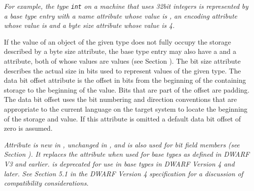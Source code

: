 \textit{For example, the 
 type \texttt{int} on a machine that uses 32\dash bit
integers is represented by a base type entry with a name
attribute whose value is , an encoding attribute
whose value is \DWATEsigned{}
and a byte size attribute whose value is 4.}

If the value of an object of the given type does not fully
occupy the storage described by a byte size attribute,
\hypertarget{chap:DWATdatabitoffsetbasetypebitlocation}{}
the base type entry may also have 
a 
\DWATbitsize{} and a
\DWATdatabitoffset{} attribute, 
both 
of whose values are
 values
(see Section ). 
The bit size
attribute describes the actual size in bits used to represent
values of the given type. The data bit offset attribute is the
offset in bits from the beginning of the containing storage to
the beginning of the value. Bits that are part of the offset
are padding. The data bit offset uses the bit numbering and
direction conventions that are appropriate to the current
language on the
target system to locate the beginning of the storage and
value. If this attribute is omitted a default data bit offset
of zero is assumed.

\textit{Attribute 
\DWATdatabitoffset{} 
is 
new 
in 
, unchanged in , and
is also used for bit field members 
(see Section ). 
It
\hypertarget{chap:DWATbitoffsetbasetypebitlocation}{}
replaces the attribute 
\DWATbitoffset{} 
when used for base
types as defined in DWARF V3 and earlier.
\DWATbitoffset{}
is deprecated for use in base types in DWARF Version 4 and later.
See Section 5.1 in the DWARF Version 4
specification for a discussion of compatibility considerations.}

